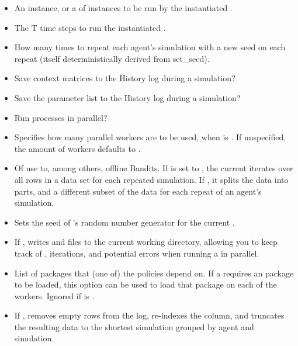 \documentclass{jss}\usepackage[]{graphicx}\usepackage[]{color}
\begin{document}
\begin{itemize}
   \item{}{
     An  instance, or a  of  instances to be run by the instantiated .
   }
   \item{}{
     The T time steps to run the instantiated .
   }
   \item{}{
     How many times to repeat each agent's simulation with a new seed on each repeat (itself deterministically derived from set\_seed).
   }
   \item{}{
     Save context matrices  to the History log during a simulation?
   }
   \item{}{
     Save the parameter list  to the History log during a simulation?
   }
   \item{}{
      Run  processes in parallel?
   }
   \item{}{
      Specifies how many parallel workers are to be used, when  is . If unspecified, the amount of workers defaults to .
   }
   \item{}{
      Of use to, among others, offline Bandits.
      If  is set to , the current 
      iterates over all rows in a data set for each repeated simulation.
      If , it splits the data into  parts,
      and a different subset of the data for each repeat of an agent's simulation.
   }
   \item{}{
      Sets the seed of 's random number generator for the current .
   }
   \item{}{
       If ,  writes  and 
       files to the current working directory, allowing you to keep track of , iterations,
       and potential errors when running a  in parallel.
   }
   \item{}{
       List of packages that (one of) the policies depend on. If a  requires an
        package to be loaded, this option can be used to load that package on each of the workers.
       Ignored if  is .
   }
   \item{}{
      If , removes empty rows from the  log,
      re-indexes the  column, and truncates the resulting data to the shortest simulation
      grouped by agent and simulation.
   }
\end{itemize}
\end{document}
